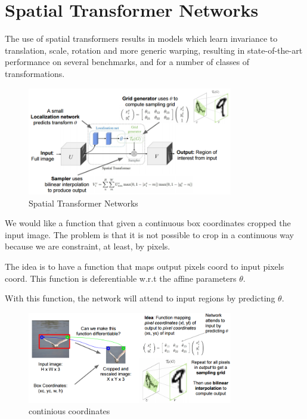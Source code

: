 \chapter{Spatial Transformer Networks}

The use of spatial transformers results in models which learn invariance to translation, scale, rotation and more generic warping, resulting in state-of-the-art performance on several benchmarks, and for a number of classes of transformations.

\begin{figure}[h]
  \centering
  \includegraphics[width=0.8\textwidth]{Images/spatial_transformer_networks/2.png}
  \caption{Spatial Transformer Networks}
\end{figure}

We would like a function that given a continuous box coordinates cropped the input image. The problem is that it is not possible to crop in a continuous way because we are constraint, at least, by pixels.

The idea is to have a function that maps output pixels coord to input pixels coord. This function is deferentiable w.r.t the affine parameters $\theta$.

With this function, the network will attend to input regions by predicting $\theta$.

\begin{figure}[h]
  \centering
  \includegraphics[width=0.8\textwidth]{Images/spatial_transformer_networks/1.png}
  \caption{continious coordinates}
\end{figure}

